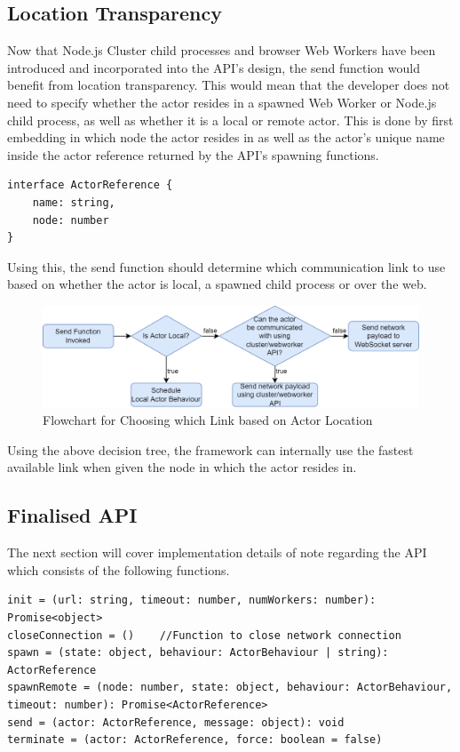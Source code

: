 \documentclass[oneside]{um-fict}
\begin{document}
\subsection{Location Transparency}
Now that Node.js Cluster child processes and browser Web Workers have been introduced and incorporated into the API's design, the send function would benefit from location transparency. This would mean that the developer does not need to specify whether the actor resides in a spawned Web Worker or Node.js child process, as well as whether it is a local or remote actor. This is done by first embedding in which node the actor resides in as well as the actor's unique name inside the actor reference returned by the API's spawning functions.
\begin{lstlisting}
interface ActorReference {
    name: string,
    node: number
}
\end{lstlisting}
Using this, the send function should determine which communication link to use based on whether the actor is local, a spawned child process or over the web.
\begin{figure}[H]
    \begin{centering}
        \includegraphics[width=\textwidth]{resources/communication.png}
        \caption{Flowchart for Choosing which Link based on Actor Location}
    \end{centering}
\end{figure}
Using the above decision tree, the framework can internally use the fastest available link when given the node in which the actor resides in.
\subsection{Finalised API}
The next section will cover implementation details of note regarding the API which consists of the following functions.
\begin{lstlisting}
init = (url: string, timeout: number, numWorkers: number): Promise<object>
closeConnection = ()    //Function to close network connection
spawn = (state: object, behaviour: ActorBehaviour | string): ActorReference
spawnRemote = (node: number, state: object, behaviour: ActorBehaviour, timeout: number): Promise<ActorReference>
send = (actor: ActorReference, message: object): void
terminate = (actor: ActorReference, force: boolean = false)
\end{lstlisting}
\end{document}
